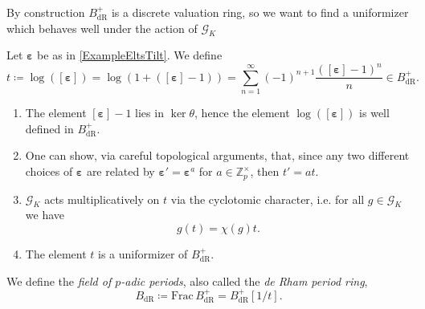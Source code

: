\noindent
By construction $B_{\mathrm{dR}}^+$ is a discrete valuation ring,
so we want to find a uniformizer which behaves well under the action of $\mathscr{G}_K$
\begin{defn}[]
	Let $\boldsymbol\varepsilon$ be as in \cref{ExampleEltsTilt}.
	We define
	\begin{equation*}
		t \coloneqq \log \left( [\boldsymbol\varepsilon] \right) =
		\log \left( 1 + ([\boldsymbol\varepsilon] - 1)\right) =
		\sum_{n = 1 }^{ \infty } (-1)^{n+1} 
		\frac{ ([\boldsymbol\varepsilon] - 1)^n }{ n }
		\in B_{\mathrm{dR}}^+
	.\end{equation*}
\end{defn}


\newpage
\begin{rem}\leavevmode\vspace{-0.2\baselineskip}
\begin{enumerate}
	\item The element $[\boldsymbol\varepsilon] - 1 $ lies in
		$\ker \theta$, hence the element $\log ([\boldsymbol\varepsilon])$
		is well defined in $B_{\mathrm{dR}}^+$.

	\item One can show, via careful topological arguments, that,
		since any two different choices of $\boldsymbol\varepsilon$
		are related by $\boldsymbol\varepsilon' = \boldsymbol\varepsilon^a$
		for $a \in \mathbb{Z}_{p}^{\times}$, then
		$t' = a t$.

	\item $\mathscr{G}_K$ acts multiplicatively on $t$ via the cyclotomic character,
		i.e. for all $g \in \mathscr{G}_K$ we have
		\begin{equation*}
		g(t) = \chi(g) t
		.\end{equation*}

	\item The element $t$ is a uniformizer of $B_{\mathrm{dR}}^+$.
\end{enumerate}
\end{rem}


\begin{defn}
	We define the \emph{field of $p$-adic periods}, also called
	the \emph{de Rham period ring},
	\begin{equation*}
	B_{\mathrm{dR}} \coloneqq \mathrm{Frac}\, B_{\mathrm{dR}}^+ =
	B_{\mathrm{dR}}^+[1/t]
	.\end{equation*}
\end{defn}



